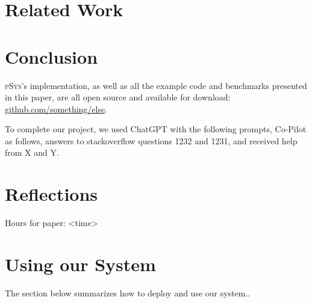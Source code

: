 \documentclass[sigplan, screen, 10pt]{acmart}
\newcommand{\sys}{{\scshape pSys}\xspace}
\begin{document}
\section{Related Work}
\label{related}

\section{Conclusion}
\label{conclusion}

\sys's implementation, as well as all the example code and benchmarks presented in this paper, are all open source and available for download:
\href{https://github.com/something/else}{github.com/something/else}.

\begin{acks}
To complete our project, we used ChatGPT with the following prompts, Co-Pilot as follows, answers to stackoverflow questions 1232 and 1231, and received help from X and Y.
\end{acks}

{\small

}

\appendix

\section{Reflections}
\label{reflections}



Hours for paper: <time>

\section{Using our System}
\label{using-apx}

The section below summarizes how to deploy and use our system..
\end{document}
